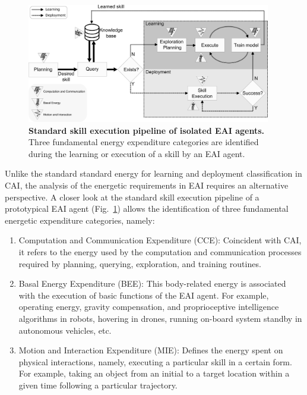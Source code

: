 \documentclass[12pt]{article}
\begin{document}
\begin{figure}[t!]
	\centering
	\hspace*{\fill}
	\includegraphics[width=0.95\textwidth]{embodied_ai_learning_pipeline.png}
	\hspace*{\fill}
	\caption[] {\label{fig:embodied_ai_pipeline} \textbf{Standard skill execution pipeline of isolated EAI agents.} {Three fundamental energy expenditure categories are identified during the learning or execution of a skill by an EAI agent.}}
\end{figure}

Unlike the standard standard energy for learning and deployment classification in CAI, the analysis of the energetic requirements in EAI requires an alternative perspective. A closer look at the standard skill execution pipeline of a prototypical EAI agent (Fig.~\ref{fig:embodied_ai_pipeline}) allows the identification of three fundamental energetic expenditure categories, namely:
\begin{enumerate}
	\item Computation and Communication Expenditure (CCE): Coincident with CAI, it refers to the energy used by the computation and communication processes required by planning, querying, exploration, and training routines.
	\item Basal Energy Expenditure (BEE): This body-related energy is associated with the execution of basic functions of the EAI agent. For example, operating energy, gravity compensation, and proprioceptive intelligence algorithms in robots, hovering in drones, running on-board system standby in autonomous vehicles, etc.
	\item Motion and Interaction Expenditure (MIE): Defines the energy spent on physical interactions, namely, executing a particular skill in a certain form. For example, taking an object from an initial to a target location within a given time following a particular trajectory.
\end{enumerate}
\end{document}
